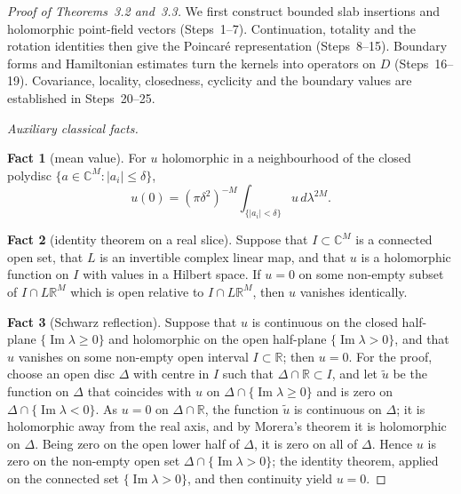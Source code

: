 \documentclass[11pt,letterpaper,reqno]{amsart}
\theoremstyle{definition}
\begin{document}
\begin{proof}[Proof of Theorems~3.2 and~3.3]
We first construct bounded slab insertions and holomorphic point-field
vectors (Steps~1--7). Continuation, totality and the rotation identities
then give the Poincar\'e representation (Steps~8--15). Boundary forms
and Hamiltonian estimates turn the kernels into operators on $D$
(Steps~16--19). Covariance, locality, closedness, cyclicity and the
boundary values are established in Steps~20--25.

\emph{Auxiliary classical facts.}

\textbf{Fact 1} (mean value).
For $u$ holomorphic in a neighbourhood of the closed polydisc $\{a\in\mathbb C^M:|a_i|\le\delta\}$,
\begin{equation*}
u(0)=(\pi\delta^2)^{-M}\int_{\{|a_i|<\delta\}}u\,d\lambda^{2M}.
\end{equation*}

\textbf{Fact 2} (identity theorem on a real slice).
Suppose that $I\subset\mathbb C^M$ is a connected open set, that $L$ is an invertible complex linear map, and that $u$ is a holomorphic function on $I$ with values in a Hilbert space.
If $u=0$ on some non-empty subset of $I\cap L\mathbb R^M$ which is open relative to $I\cap L\mathbb R^M$, then $u$ vanishes identically.

\textbf{Fact 3} (Schwarz reflection).
Suppose that $u$ is continuous on the closed half-plane $\{\operatorname{Im}\lambda\ge0\}$ and holomorphic on the open half-plane $\{\operatorname{Im}\lambda>0\}$, and that $u$ vanishes on some non-empty open interval $I\subset\mathbb R$; then $u=0$.
For the proof, choose an open disc $\Delta$ with centre in $I$ such that $\Delta\cap\mathbb R\subset I$, and let $\tilde u$ be the function on $\Delta$ that coincides with $u$ on $\Delta\cap\{\operatorname{Im}\lambda\ge0\}$ and is zero on $\Delta\cap\{\operatorname{Im}\lambda<0\}$.
As $u=0$ on $\Delta\cap\mathbb R$, the function $\tilde u$ is continuous on $\Delta$; it is holomorphic away from the real axis, and by Morera's theorem it is holomorphic on $\Delta$.
Being zero on the open lower half of $\Delta$, it is zero on all of $\Delta$.
Hence $u$ is zero on the non-empty open set $\Delta\cap\{\operatorname{Im}\lambda>0\}$; the identity theorem, applied on the connected set $\{\operatorname{Im}\lambda>0\}$, and then continuity yield $u=0$.


\end{proof}
\end{document}

